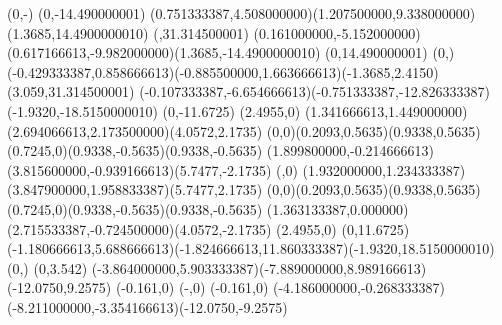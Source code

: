 {        \rlineto(0,-)
        \rlineto(0,-14.490000001)
    \rcurveto(0.751333387,4.508000000)(1.207500000,9.338000000)(1.3685,14.4900000010)
    \closepath
    \moveto(,31.314500001)
    \rcurveto(0.161000000,-5.152000000)(0.617166613,-9.982000000)(1.3685,-14.4900000010)
        \rlineto(0,14.490000001)
        \rlineto(0,)
    \rcurveto(-0.429333387,0.858666613)(-0.885500000,1.663666613)(-1.3685,2.4150)
    \closepath
    \moveto(3.059,31.314500001)
    \rcurveto(-0.107333387,-6.654666613)(-0.751333387,-12.826333387)(-1.9320,-18.5150000010)
    \rlineto(0,-11.6725)
    \rlineto(2.4955,0)
    \rcurveto(1.341666613,1.449000000)(2.694066613,2.173500000)(4.0572,2.1735)
    \rcurveto(0,0)(0.2093,0.5635)(0.9338,0.5635)
    \rcurveto(0.7245,0)(0.9338,-0.5635)(0.9338,-0.5635)
    \rcurveto(1.899800000,-0.214666613)(3.815600000,-0.939166613)(5.7477,-2.1735)
    \rlineto(,0)
    \rcurveto(1.932000000,1.234333387)(3.847900000,1.958833387)(5.7477,2.1735)
    \rcurveto(0,0)(0.2093,0.5635)(0.9338,0.5635)
    \rcurveto(0.7245,0)(0.9338,-0.5635)(0.9338,-0.5635)
    \rcurveto(1.363133387,0.000000)(2.715533387,-0.724500000)(4.0572,-2.1735)
    \rlineto(2.4955,0)
    \rlineto(0,11.6725)
    \rcurveto(-1.180666613,5.688666613)(-1.824666613,11.860333387)(-1.9320,18.5150000010)
        \rlineto(0,)
        \rlineto(0,3.542)
    \rcurveto(-3.864000000,5.903333387)(-7.889000000,8.989166613)(-12.0750,9.2575)
        \rlineto(-0.161,0)
        \rlineto(-,0)
        \rlineto(-0.161,0)
    \rcurveto(-4.186000000,-0.268333387)(-8.211000000,-3.354166613)(-12.0750,-9.2575)
    \closepath
}
